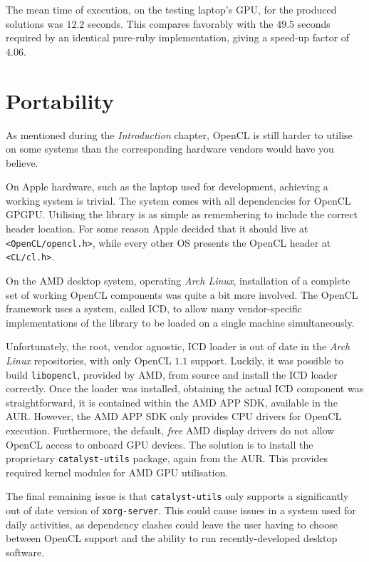 The mean time of execution, on the testing laptop's \ac{GPU}, for the produced solutions was $12.2$ seconds.
This compares favorably with the $49.5$ seconds required by an identical pure-ruby implementation, giving a speed-up factor of $4.06$.

\section{Portability}
As mentioned during the \emph{Introduction} chapter, \ac{OpenCL} is still harder to utilise on some systems than the corresponding hardware vendors would have you believe.

On Apple hardware, such as the laptop used for development, achieving a working system is trivial.
The system comes with all dependencies for \ac{OpenCL} \ac{GPGPU}. Utilising the library is as simple as remembering to include the correct header location. For some reason Apple decided that it should live at \verb|<OpenCL/opencl.h>|, while every other \ac{OS} presents the \ac{OpenCL} header at \verb|<CL/cl.h>|.

On the \ac{AMD} desktop system, operating \emph{Arch Linux}, installation of a complete set of working \ac{OpenCL} components was quite a bit more involved.
The \ac{OpenCL} framework uses a system, called \ac{ICD}, to allow many vendor-specific implementations of the library to be loaded on a single machine simultaneously.

Unfortunately, the root, vendor agnostic, \ac{ICD} loader is out of date in the \emph{Arch Linux} repositories, with only \ac{OpenCL} $1.1$ support. Luckily, it was possible to build \verb|libopencl|, provided by \ac{AMD}, from source and install the \ac{ICD} loader correctly.
Once the loader was installed, obtaining the actual \ac{ICD} component was straightforward, it is contained within the \ac{AMD} APP SDK, available in the \ac{AUR}.
However, the AMD APP SDK only provides \ac{CPU} drivers for \ac{OpenCL} execution. Furthermore, the default, \emph{free} \ac{AMD} display drivers do not allow \ac{OpenCL} access to onboard \ac{GPU} devices. The solution is to install the proprietary \verb|catalyst-utils| package, again from the \ac{AUR}. This provides required kernel modules for \ac{AMD} \ac{GPU} utilisation.

The final remaining issue is that \verb|catalyst-utils| only supports a significantly out of date version of \verb|xorg-server|. This could cause issues in a system used for daily activities, as dependency clashes could leave the user having to choose between \ac{OpenCL} support and the ability to run recently-developed desktop software.
